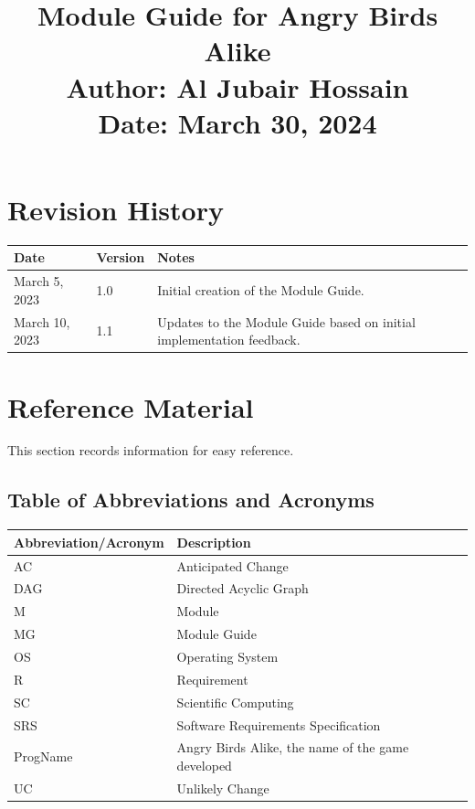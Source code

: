 \documentclass[12pt]{article}
\title{
    {\Huge Module Guide for Angry Birds Alike} \\
    {\Large Author: Al Jubair Hossain} \\
    {\large Date: March 30, 2024}
}
\date{}
\begin{document}
\maketitle

\newpage

\section*{Revision History}
\begin{longtable}{|p{2cm}|p{2cm}|p{10cm}|}
    \hline
    \textbf{Date} & \textbf{Version} & \textbf{Notes} \\
    \hline
    March 5, 2023 & 1.0 & Initial creation of the Module Guide. \\\hline
    March 10, 2023 & 1.1 & Updates to the Module Guide based on initial implementation feedback. \\
    \hline
\end{longtable}

\newpage

\tableofcontents

\newpage

\section{Reference Material}
This section records information for easy reference.

\subsection{Table of Abbreviations and Acronyms}
\begin{longtable}{|l|l|}
    \hline
    \textbf{Abbreviation/Acronym} & \textbf{Description} \\
    \hline
    AC & Anticipated Change \\
    DAG & Directed Acyclic Graph \\
    M & Module \\
    MG & Module Guide \\
    OS & Operating System \\
    R & Requirement \\
    SC & Scientific Computing \\
    SRS & Software Requirements Specification \\
    ProgName & Angry Birds Alike, the name of the game developed \\
    UC & Unlikely Change \\
    \hline
\end{longtable}
\end{document}
